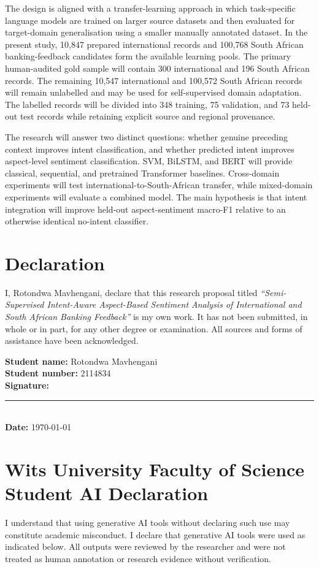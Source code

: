 \documentclass[11pt,a4paper]{article}
\begin{document}
The design is aligned with a transfer-learning approach in which task-specific language models are trained on larger source datasets and then evaluated for target-domain generalisation using a smaller manually annotated dataset. In the present study, 10,847 prepared international records and 100,768 South African banking-feedback candidates form the available learning pools. The primary human-audited gold sample will contain 300 international and 196 South African records. The remaining 10,547 international and 100,572 South African records will remain unlabelled and may be used for self-supervised domain adaptation. The labelled records will be divided into 348 training, 75 validation, and 73 held-out test records while retaining explicit source and regional provenance.

The research will answer two distinct questions: whether genuine preceding context improves intent classification, and whether predicted intent improves aspect-level sentiment classification. SVM, BiLSTM, and BERT will provide classical, sequential, and pretrained Transformer baselines. Cross-domain experiments will test international-to-South-African transfer, while mixed-domain experiments will evaluate a combined model. The main hypothesis is that intent integration will improve held-out aspect-sentiment macro-F1 relative to an otherwise identical no-intent classifier.

\clearpage
\section*{Declaration}
I, Rotondwa Mavhengani, declare that this research proposal titled \textit{``Semi-Supervised Intent-Aware Aspect-Based Sentiment Analysis of International and South African Banking Feedback''} is my own work. It has not been submitted, in whole or in part, for any other degree or examination. All sources and forms of assistance have been acknowledged.

\vspace{1.5cm}
\noindent\textbf{Student name:} Rotondwa Mavhengani\\[0.5cm]
\textbf{Student number:} 2114834\\[0.5cm]
\textbf{Signature:} \rule{6cm}{0.4pt}\\[0.5cm]
\textbf{Date:} \today

\clearpage
\section*{Wits University Faculty of Science Student AI Declaration}
\small
I understand that using generative AI tools without declaring such use may constitute academic misconduct. I declare that generative AI tools were used as indicated below. All outputs were reviewed by the researcher and were not treated as human annotation or research evidence without verification.
\end{document}
